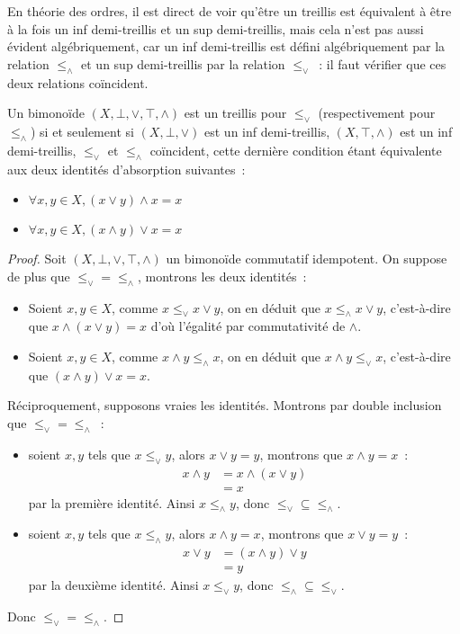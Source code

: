 En théorie des ordres, il est direct de voir qu'être un treillis est équivalent
à être à la fois un inf demi-treillis et un sup demi-treillis, mais cela n'est
pas aussi évident algébriquement, car un inf demi-treillis est défini
algébriquement par la relation $\leq_\land$ et un sup demi-treillis par la
relation $\leq_\lor$~: il faut vérifier que ces deux relations coïncident.

\begin{proposition}
  Un bimonoïde $(X,\bot,\lor,\top,\land)$ est un treillis pour $\leq_\lor$
  (respectivement pour $\leq_\land$) si et seulement si $(X,\bot,\lor)$ est un
  inf demi-treillis, $(X,\top,\land)$ est un inf demi-treillis, $\leq_\lor$ et
  $\leq_\land$ coïncident, cette dernière condition étant équivalente aux
  deux identités d'absorption suivantes~:
  \begin{itemize}
  \item $\forall x,y\in X, (x\lor y)\land x = x$
  \item $\forall x,y\in X, (x\land y)\lor x = x$
  \end{itemize}
\end{proposition}

\begin{proof}
  Soit $(X,\bot,\lor,\top,\land)$ un bimonoïde commutatif idempotent. On
  suppose de plus que $\leq_\lor = \leq_\land$, montrons les deux identités~:
  \begin{itemize}
  \item Soient $x,y\in X$, comme $x\leq_\lor x\lor y$, on en déduit que
    $x\leq_\land x\lor y$, c'est-à-dire que $x\land (x\lor y) = x$ d'où
    l'égalité par commutativité de $\land$.
  \item Soient $x,y\in X$, comme $x\land y\leq_\land x$, on en déduit que
    $x\land y \leq_\lor x$, c'est-à-dire que $(x\land y)\lor x = x$.
  \end{itemize}

  Réciproquement, supposons vraies les identités. Montrons par double inclusion
  que $\leq_\lor = \leq_\land$~:
  \begin{itemize}
  \item soient $x,y$ tels que $x\leq_\lor y$, alors $x\lor y = y$, montrons que
    $x\land y = x$~:
    \begin{align*}
      x \land y &= x \land (x \lor y)\\
      &= x
    \end{align*}
    par la première identité. Ainsi $x\leq_\land y$, donc
    $\leq_\lor\subseteq\leq_\land$.
  \item soient $x,y$ tels que $x\leq_\land y$, alors $x\land y = x$, montrons que
    $x\lor y = y$~:
    \begin{align*}
      x \lor y &= (x\land y) \lor y\\
      &= y
    \end{align*}
    par la deuxième identité. Ainsi $x\leq_\lor y$, donc
    $\leq_\land\subseteq\leq_\lor$.
  \end{itemize}
  Donc $\leq_\lor = \leq_\land$.
\end{proof}

